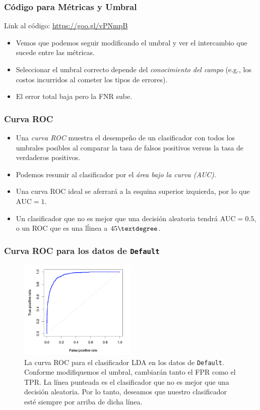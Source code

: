 \documentclass[usenames,dvipsnames]{beamer} %
\newcommand\vari[1]{\textcolor{BrickRed}{\texttt{#1}}}
\newcommand\defi[1]{\textcolor{NavyBlue}{\textit{#1}}}
\begin{document}
\begin{frame}\frametitle{C\'odigo para M\'etricas y Umbral}

\begin{center}
	Link al c\'odigo:
	\href{https://goo.gl/vPNmpB}{https://goo.gl/vPNmpB}
\end{center}
\begin{itemize}
	\item Vemos que podemos seguir modificando el umbral y ver el intercambio que sucede entre las m\'etricas.
	\item Seleccionar el umbral correcto depende del \textit{conocimiento del campo} (e.g., los costos incurridos al cometer los tipos de errores).
	\item El error total baja pero la FNR sube.
\end{itemize}
\end{frame}

\begin{frame}\frametitle{Curva ROC}
\begin{itemize}
	\item Una \defi{curva ROC} muestra el desempe\~no de un clasificador con todos los umbrales posibles al comparar la tasa de falsos positivos versus la tasa de verdaderos positivos.
	\item Podemos resumir al clasificador por el \defi{\'area bajo la curva (AUC)}.
	\item Una curva ROC ideal se aferrar\'a a la esquina superior izquierda, por lo que $\text{AUC}=1$.
	\item Un clasificador que no es mejor que una decisi\'on aleatoria tendr\'a $\text{AUC}=0.5$, o un ROC que es una l\'linea a $45\textdegree$.
\end{itemize}
\end{frame}

\begin{frame}\frametitle{Curva ROC para los datos de \vari{Default}}
\begin{figure}
	\centering
	\includegraphics[width=0.5\textwidth]{images/islr/fig_4_8.png}
	\caption{La curva ROC para el clasificador LDA en los datos de \vari{Default}. Conforme modifiquemos el umbral, cambiar\'an tanto el FPR como el TPR. La l\'inea punteada es el clasificador que no es mejor que una decisi\'on aleatoria. Por lo tanto, deseamos que nuestro clasificador est\'e siempre por arriba de dicha l\'inea.}
	\label{fig:islr_4-8}
\end{figure}
\end{frame}
\end{document}
